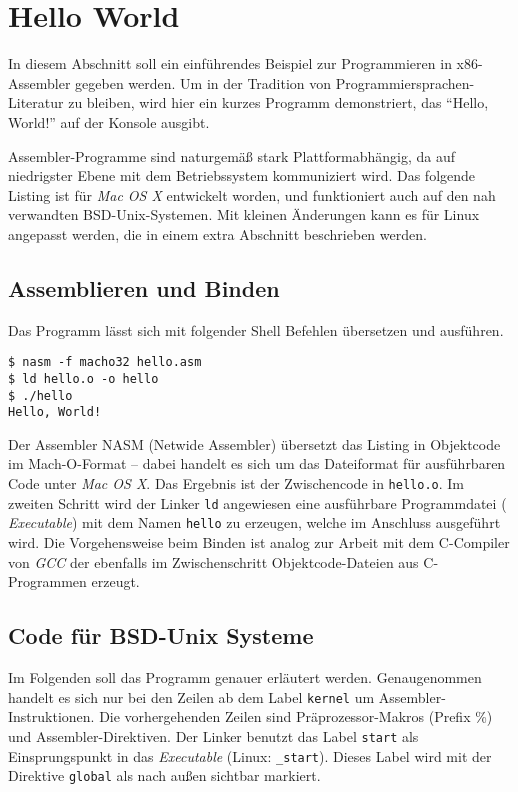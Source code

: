 \section{Hello World}

In diesem Abschnitt soll ein einführendes Beispiel zur Programmieren in x86-Assembler gegeben werden. Um in der Tradition von Programmiersprachen-Literatur zu bleiben, wird hier ein kurzes Programm demonstriert, das ``Hello, World!'' auf der Konsole ausgibt.

Assembler-Programme sind naturgemäß stark Plattformabhängig, da auf niedrigster Ebene mit dem Betriebssystem kommuniziert wird.
Das folgende Listing ist für \emph{Mac OS X} entwickelt worden, und
funktioniert auch auf den nah verwandten BSD-Unix-Systemen. Mit kleinen Änderungen kann es für Linux angepasst werden, die in einem extra Abschnitt beschrieben werden.

\subsection{Assemblieren und Binden}

Das Programm lässt sich mit folgender Shell Befehlen übersetzen und ausführen.

\begin{lstlisting}[caption=Assemblieren und Binden von hello.asm]
$ nasm -f macho32 hello.asm
$ ld hello.o -o hello
$ ./hello
Hello, World!
\end{lstlisting}

Der Assembler NASM (Netwide Assembler) übersetzt das Listing in Objektcode im Mach-O-Format – dabei handelt es sich um das Dateiformat für ausführbaren Code unter \emph{Mac OS X}. Das Ergebnis ist der Zwischencode in \texttt{hello.o}. Im zweiten Schritt wird der Linker \texttt{ld} angewiesen eine ausführbare Programmdatei (\emph{ Executable}) mit dem Namen \texttt{hello} zu erzeugen, welche im Anschluss ausgeführt wird. Die Vorgehensweise beim Binden ist analog zur Arbeit mit dem C-Compiler von \emph{GCC} der ebenfalls im Zwischenschritt Objektcode-Dateien aus C-Programmen erzeugt.

\subsection{Code für BSD-Unix Systeme}

Im Folgenden soll das Programm genauer erläutert werden. Genaugenommen handelt es sich nur bei den Zeilen ab dem Label \texttt{kernel} um Assembler-Instruktionen. Die vorhergehenden Zeilen sind Präprozessor-Makros (Prefix \%) und Assembler-Direktiven. Der Linker benutzt das Label {\tt start} als Einsprungspunkt in das \emph{Executable} (Linux: {\tt \_start}).
Dieses Label wird mit der Direktive {\tt global} als nach außen sichtbar markiert.

